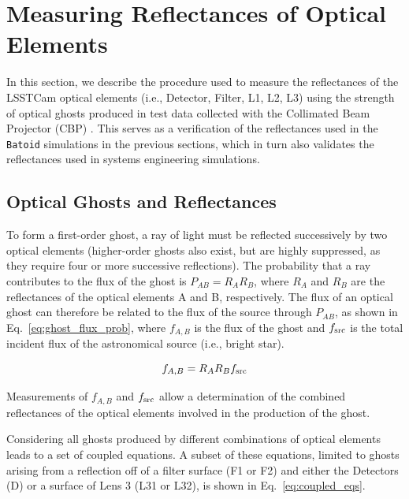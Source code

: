 \section{Measuring Reflectances of Optical Elements} 
\label{sec:reflectances}
In this section, we describe the procedure used to measure the reflectances of the LSSTCam optical elements (i.e., Detector, Filter, L1, L2, L3) using the strength of optical ghosts produced in test data collected with the Collimated Beam Projector (CBP) \citep{2016SPIE.9906E..0OI}. 
This serves as a verification of the reflectances used in the \texttt{Batoid} simulations in the previous sections, which in turn also validates the reflectances used in systems engineering simulations.

\subsection{Optical Ghosts and Reflectances}
\label{sec:reflectance_theory}
To form a first-order ghost, a ray of light must be reflected successively by two optical elements (higher-order ghosts also exist, but are highly suppressed, as they require four or more successive reflections).
The probability that a ray contributes to the flux of the ghost is $P_{AB} = R_A R_B$, where $R_A$ and $R_B$ are the reflectances of the optical elements A and B, respectively.
The flux of an optical ghost can therefore be related to the flux of the source through $P_{AB}$, as shown in Eq.~\ref{eq:ghost_flux_prob}, where $f_{A, B}$ is the flux of the ghost and $f_{\rm src}$ is the total incident flux of the astronomical source (i.e., bright star).

\begin{equation}
\label{eq:ghost_flux_prob}
f_{A,B} = R_A R_B f_{\rm src}
\end{equation}

\noindent Measurements of $f_{A,B}$ and $f_{\rm src}$ allow a determination of the combined reflectances of the optical elements involved in the production of the ghost.

Considering all ghosts produced by different combinations of optical elements leads to a set of coupled equations.
A subset of these equations, limited to ghosts arising from a reflection off of a filter surface (F1 or F2) and either the  Detectors (D) or a surface of Lens 3 (L31 or L32), is shown in Eq.~\ref{eq:coupled_eqs}.

